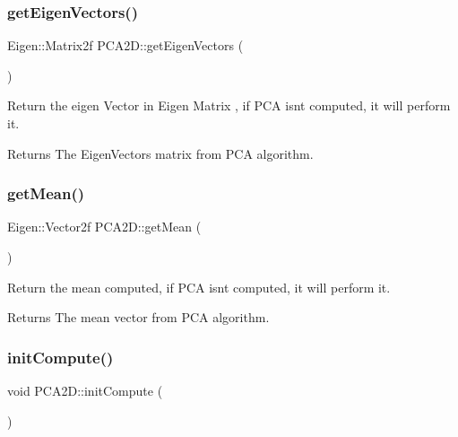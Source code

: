 \subsubsection{\texorpdfstring{get\+Eigen\+Vectors()}{getEigenVectors()}}
{\footnotesize\ttfamily Eigen\+::\+Matrix2f P\+C\+A2\+D\+::get\+Eigen\+Vectors (\begin{DoxyParamCaption}{ }\end{DoxyParamCaption})\hspace{0.3cm}{\ttfamily [inline]}}



Return the eigen Vector in Eigen Matrix , if P\+CA isn\textquotesingle{}t computed, it will perform it. 

\begin{DoxyReturn}{Returns}
The Eigen\+Vectors matrix from P\+CA algorithm. 
\end{DoxyReturn}
\mbox{\label{classPCA2D_a35ed9e55a614bb7fd87025945867cffa}} 
\subsubsection{\texorpdfstring{get\+Mean()}{getMean()}}
{\footnotesize\ttfamily Eigen\+::\+Vector2f P\+C\+A2\+D\+::get\+Mean (\begin{DoxyParamCaption}{ }\end{DoxyParamCaption})\hspace{0.3cm}{\ttfamily [inline]}}



Return the mean computed, if P\+CA isn\textquotesingle{}t computed, it will perform it. 

\begin{DoxyReturn}{Returns}
The mean vector from P\+CA algorithm. 
\end{DoxyReturn}
\mbox{\label{classPCA2D_a80df2e612db722f630d4c48a9a71f651}} 
\subsubsection{\texorpdfstring{init\+Compute()}{initCompute()}}
{\footnotesize\ttfamily void P\+C\+A2\+D\+::init\+Compute (\begin{DoxyParamCaption}{ }\end{DoxyParamCaption})}



